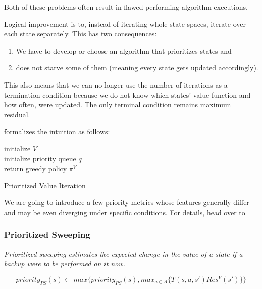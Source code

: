 Both of these problems often result in flawed performing algorithm executions.

Logical improvement is to, instead of iterating whole state spaces, iterate over each state separately. This has two consequences:
\begin{enumerate}
    \item We have to develop or choose an algorithm that prioritizes states and 
    \item does not starve some of them (meaning every state gets updated accordingly).
\end{enumerate}

This also means that we can no longer use the number of iterations as a termination condition because we do not know which states' value function and how often, were updated. The only terminal condition remains maximum residual.

\cite{Kolobov2012} formalizes the intuition as follows:

\LinesNumbered
\begin{algorithm}
\SetAlgoLined
initialize $V$ \\
initialize priority queue $q$ \\
return greedy policy $\pi^{V}$
\caption{Prioritized Value Iteration}
\end{algorithm}

We are going to introduce a few priority metrics whose features generally differ and may be even diverging under specific conditions. For details, head over to \cite{Kolobov2012}

\subsubsection{Prioritized Sweeping} 

\textit{Prioritized sweeping estimates the expected change in the value of a state if a backup were to be performed on it now.}

\begin{equation}priority_{PS} (s) \xleftarrow{} max \Big\{ priority_{PS} (s), max_{a \in A} \big\{ T(s, a, s') Res^{V}(s')\big\} \Big\} \end{equation}

